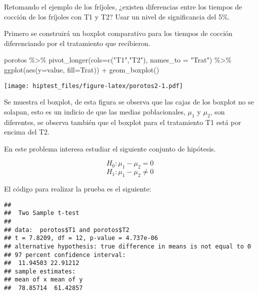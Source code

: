 \documentclass[
]{article}
\newenvironment{Shaded}{}{}
\newcommand{\AttributeTok}[1]{\textcolor[rgb]{0.49,0.56,0.16}{#1}}
\newcommand{\ConstantTok}[1]{\textcolor[rgb]{0.53,0.00,0.00}{#1}}
\newcommand{\DecValTok}[1]{\textcolor[rgb]{0.25,0.63,0.44}{#1}}
\newcommand{\FloatTok}[1]{\textcolor[rgb]{0.25,0.63,0.44}{#1}}
\newcommand{\FunctionTok}[1]{\textcolor[rgb]{0.02,0.16,0.49}{#1}}
\newcommand{\NormalTok}[1]{#1}
\newcommand{\SpecialCharTok}[1]{\textcolor[rgb]{0.25,0.44,0.63}{#1}}
\newcommand{\StringTok}[1]{\textcolor[rgb]{0.25,0.44,0.63}{#1}}
\begin{document}
Retomando el ejemplo de los fríjoles, ¿existen diferencias entre los
tiempos de cocción de los fríjoles con T1 y T2? Usar un nivel de
significancia del 5\%.

Primero se construirá un boxplot comparativo para los tiempos de cocción
diferenciando por el tratamiento que recibieron.

\begin{Shaded}
\begin{Highlighting}[]
\NormalTok{porotos }\SpecialCharTok{\%\textgreater{}\%} \FunctionTok{pivot\_longer}\NormalTok{(}\AttributeTok{cols=}\FunctionTok{c}\NormalTok{(}\StringTok{"T1"}\NormalTok{,}\StringTok{"T2"}\NormalTok{), }\AttributeTok{names\_to =} \StringTok{"Trat"}\NormalTok{) }\SpecialCharTok{\%\textgreater{}\%} 
  \FunctionTok{ggplot}\NormalTok{(}\FunctionTok{aes}\NormalTok{(}\AttributeTok{y=}\NormalTok{value, }\AttributeTok{fill=}\NormalTok{Trat)) }\SpecialCharTok{+}
  \FunctionTok{geom\_boxplot}\NormalTok{()}
\end{Highlighting}
\end{Shaded}

\texttt{[image: hiptest\_files/figure-latex/porotos2-1.pdf]}

Se muestra el boxplot, de esta figura se observa que las cajas de los
boxplot no se solapan, esto es un indicio de que las medias
poblacionales, \(\mu_1\) y \(\mu_2\), son diferentes, se observa también
que el boxplot para el tratamiento T1 está por encima del T2.

En este problema interesa estudiar el siguiente conjunto de hipótesis.

\[H_0: \mu_1  - \mu_2 = 0\] \[H_1: \mu_1  - \mu_2 \neq 0\]

El código para realizar la prueba es el siguiente:

\begin{Shaded}
\end{Shaded}

\begin{verbatim}
## 
##  Two Sample t-test
## 
## data:  porotos$T1 and porotos$T2
## t = 7.8209, df = 12, p-value = 4.737e-06
## alternative hypothesis: true difference in means is not equal to 0
## 97 percent confidence interval:
##  11.94503 22.91212
## sample estimates:
## mean of x mean of y 
##  78.85714  61.42857
\end{verbatim}
\end{document}
